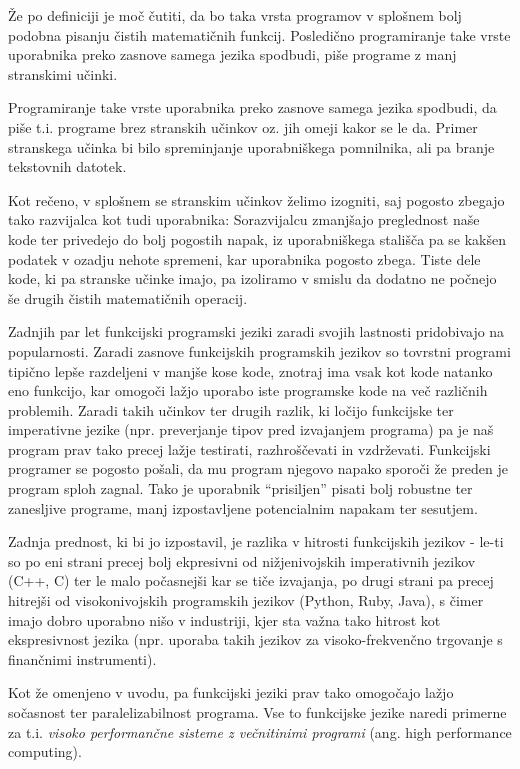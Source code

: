 \documentclass[mat1, tisk]{fmfdelo}
\begin{document}
Že po definiciji je moč čutiti, da bo taka vrsta programov v splošnem bolj podobna pisanju čistih matematičnih funkcij. Posledično programiranje take vrste uporabnika preko zasnove samega jezika
spodbudi, piše programe z manj stranskimi učinki.

Programiranje take vrste uporabnika preko zasnove samega jezika spodbudi, da piše t.i. programe brez stranskih učinkov oz. jih omeji kakor se le da. 
Primer stranskega učinka bi bilo spreminjanje uporabniškega pomnilnika, ali pa branje tekstovnih datotek.

Kot rečeno, v splošnem se stranskim učinkov želimo izogniti, saj pogosto zbegajo tako razvijalca kot tudi uporabnika: 
Sorazvijalcu zmanjšajo preglednost naše kode ter privedejo do bolj pogostih napak, iz uporabniškega stališča pa se kakšen podatek v ozadju nehote spremeni, kar uporabnika pogosto zbega. 
Tiste dele kode, ki pa stranske učinke imajo, pa izoliramo v smislu da dodatno ne počnejo še drugih čistih matematičnih operacij.


Zadnjih par let funkcijski programski jeziki zaradi svojih lastnosti pridobivajo na popularnosti. 
Zaradi zasnove funkcijskih programskih jezikov so tovrstni programi tipično lepše razdeljeni v manjše kose kode, znotraj ima vsak kot kode natanko eno funkcijo, 
kar omogoči lažjo uporabo iste programske kode na več različnih problemih. 
Zaradi takih učinkov ter drugih razlik, ki ločijo funkcijske ter imperativne jezike (npr. preverjanje tipov pred izvajanjem programa) pa je naš program prav tako precej lažje testirati, razhroščevati in vzdrževati. 
Funkcijski programer se pogosto pošali, da mu program njegovo napako sporoči že preden je program sploh zagnal. 
Tako je uporabnik ``prisiljen'' pisati bolj robustne ter zanesljive programe, manj izpostavljene potencialnim napakam ter sesutjem.

Zadnja prednost, ki bi jo izpostavil, je razlika v hitrosti funkcijskih jezikov - le-ti so po eni strani precej bolj ekpresivni od nižjenivojskih imperativnih jezikov (C++, C) 
ter le malo počasnejši kar se tiče izvajanja, po drugi strani pa precej  hitrejši od visokonivojskih programskih jezikov (Python, Ruby, Java), 
s čimer imajo dobro uporabno nišo v industriji, kjer sta važna tako hitrost kot ekspresivnost jezika (npr. uporaba takih jezikov za visoko-frekvenčno trgovanje s finančnimi instrumenti).

Kot že omenjeno v uvodu, pa funkcijski jeziki prav tako omogočajo lažjo sočasnost ter paralelizabilnost programa. 
Vse to funkcijske jezike naredi primerne za t.i. \textit{visoko performančne sisteme z večnitinimi programi} (ang. high performance computing).
\end{document}
